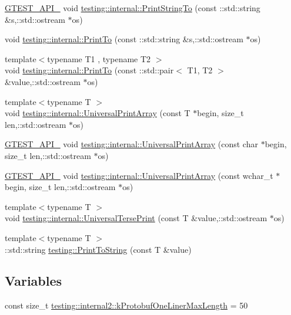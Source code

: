 \begin{DoxyCompactItemize}
\item 
\hyperlink{gtest-port_8h_aa73be6f0ba4a7456180a94904ce17790}{G\+T\+E\+S\+T\+\_\+\+A\+P\+I\+\_\+} void \hyperlink{namespacetesting_1_1internal_a0b11505e1a4527c1f1d8c1c5cdfb71b5}{testing\+::internal\+::\+Print\+String\+To} (const \+::std\+::string \&s,\+::std\+::ostream $\ast$os)
\item 
void \hyperlink{namespacetesting_1_1internal_a1bcff7765fb78cedada8d09f7159ab7e}{testing\+::internal\+::\+Print\+To} (const \+::std\+::string \&s,\+::std\+::ostream $\ast$os)
\item 
{\footnotesize template$<$typename T1 , typename T2 $>$ }\\void \hyperlink{namespacetesting_1_1internal_a5759c5abed8ebab0e1a8a0f8aadab768}{testing\+::internal\+::\+Print\+To} (const \+::std\+::pair$<$ T1, T2 $>$ \&value,\+::std\+::ostream $\ast$os)
\item 
{\footnotesize template$<$typename T $>$ }\\void \hyperlink{namespacetesting_1_1internal_a73b5046a2ed65d0e2fb7cdc9bdaee3fe}{testing\+::internal\+::\+Universal\+Print\+Array} (const T $\ast$begin, size\+\_\+t len,\+::std\+::ostream $\ast$os)
\item 
\hyperlink{gtest-port_8h_aa73be6f0ba4a7456180a94904ce17790}{G\+T\+E\+S\+T\+\_\+\+A\+P\+I\+\_\+} void \hyperlink{namespacetesting_1_1internal_a3fac293aeb6e7e6b3ff3e27404f6588b}{testing\+::internal\+::\+Universal\+Print\+Array} (const char $\ast$begin, size\+\_\+t len,\+::std\+::ostream $\ast$os)
\item 
\hyperlink{gtest-port_8h_aa73be6f0ba4a7456180a94904ce17790}{G\+T\+E\+S\+T\+\_\+\+A\+P\+I\+\_\+} void \hyperlink{namespacetesting_1_1internal_ae95ea0aea80977c0870df98b27a17cac}{testing\+::internal\+::\+Universal\+Print\+Array} (const wchar\+\_\+t $\ast$begin, size\+\_\+t len,\+::std\+::ostream $\ast$os)
\item 
{\footnotesize template$<$typename T $>$ }\\void \hyperlink{namespacetesting_1_1internal_ab3d834fb6c31d29e36400cc19905294b}{testing\+::internal\+::\+Universal\+Terse\+Print} (const T \&value,\+::std\+::ostream $\ast$os)
\item 
{\footnotesize template$<$typename T $>$ }\\\+::std\+::string \hyperlink{namespacetesting_aa5717bb1144edd1d262d310ba70c82ed}{testing\+::\+Print\+To\+String} (const T \&value)
\end{DoxyCompactItemize}
\subsection*{Variables}
\begin{DoxyCompactItemize}
\item 
const size\+\_\+t \hyperlink{namespacetesting_1_1internal2_a140c8efd51e63a3def98445bff107518}{testing\+::internal2\+::k\+Protobuf\+One\+Liner\+Max\+Length} = 50
\end{DoxyCompactItemize}


